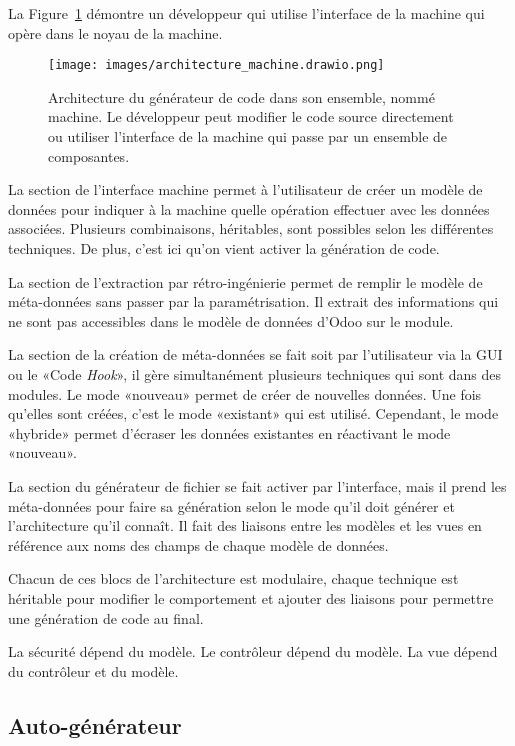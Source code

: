 La Figure~\ref{fig:dia_architecture} démontre un développeur qui utilise l'interface de la machine qui opère dans le noyau de la machine.

\begin{figure}
\centering
\texttt{[image: images/architecture\_machine.drawio.png]}
\caption{Architecture du générateur de code dans son ensemble, nommé machine. Le développeur peut modifier le code source directement ou utiliser l'interface de la machine qui passe par un ensemble de composantes.}
\label{fig:dia_architecture}
\end{figure}

La section de l’interface machine permet à l’utilisateur de créer un modèle de données pour indiquer à la machine quelle opération effectuer avec les données associées. Plusieurs combinaisons, héritables, sont possibles selon les différentes techniques. De plus, c’est ici qu’on vient activer la génération de code.

La section de l’extraction par rétro-ingénierie permet de remplir le modèle de méta-données sans passer par la paramétrisation. Il extrait des informations qui ne sont pas accessibles dans le modèle de données d’Odoo sur le module.

La section de la création de méta-données se fait soit par l’utilisateur via la GUI ou le «Code \textit{Hook}», il gère simultanément plusieurs techniques qui sont dans des modules. Le mode «nouveau» permet de créer de nouvelles données. Une fois qu’elles sont créées, c’est le mode «existant» qui est utilisé. Cependant, le mode «hybride» permet d’écraser les données existantes en réactivant le mode «nouveau».

La section du générateur de fichier se fait activer par l’interface, mais il prend les méta-données pour faire sa génération selon le mode qu’il doit générer et l’architecture qu’il connaît. Il fait des liaisons entre les modèles et les vues en référence aux noms des champs de chaque modèle de données.

Chacun de ces blocs de l’architecture est modulaire, chaque technique est héritable pour modifier le comportement et ajouter des liaisons pour permettre une génération de code au final.

La sécurité dépend du modèle. Le contrôleur dépend du modèle. La vue dépend du contrôleur et du modèle.

\subsection{Auto-générateur}

